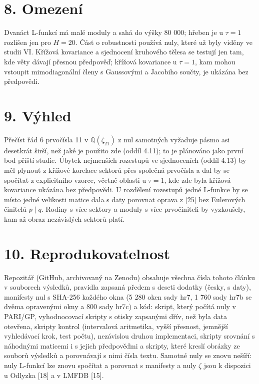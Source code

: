 \documentclass[
  10pt,
]{article}
\begin{document}
\hypertarget{omezenuxed}{%
\section{8. Omezení}\label{omezenuxed}}

Dvanáct L-funkcí má malé moduly a sahá do výšky 80 000; hřeben je u
\(\tau = 1\) rozlišen jen pro \(H = 20\). Část o robustnosti používá
nuly, které už byly viděny ve studii VI. Křížová kovariance a sjednocení
kruhového tělesa se testují jen tam, kde věty dávají přesnou předpověď;
křížová kovariance u \(\tau = 1\), kam mohou vstoupit mimodiagonální
členy s Gaussovými a Jacobiho součty, je ukázána bez předpovědi.

\hypertarget{vuxfdhled}{%
\section{9. Výhled}\label{vuxfdhled}}

Přečíst řád 6 prvočísla 11 v \(\mathbb{Q}(\zeta_{21})\) z nul samotných
vyžaduje pásmo asi desetkrát širší, než jaké je použito zde (oddíl
4.11); to je plánováno jako první bod příští studie. Úbytek nejmenších
rozestupů ve sjednoceních (oddíl 4.13) by měl plynout z křížové korelace
sektorů přes společná prvočísla a dal by se spočítat z explicitního
vzorce, včetně oblasti u \(\tau = 1\), kde zde byla křížová kovariance
ukázána bez předpovědi. U rozdělení rozestupů jedné L-funkce by se místo
jedné velikosti matice dala s daty porovnat oprava z {[}25{]} bez
Eulerových činitelů \(p \mid q\). Rodiny s více sektory a moduly s více
prvočiniteli by vyzkoušely, kam až obraz nezávislých sektorů platí.

\hypertarget{reprodukovatelnost}{%
\section{10. Reprodukovatelnost}\label{reprodukovatelnost}}

Repozitář (GitHub, archivovaný na Zenodu) obsahuje všechna čísla tohoto
článku v souborech výsledků, pravidla zapsaná předem s deseti dodatky
(česky, s daty), manifesty nul s SHA-256 každého okna (5 280 oken sady
hr7, 1 760 sady hr7b se dvěma opravenými okny a 800 sady hr7c) a kód:
skript, který počítá nuly v PARI/GP, vyhodnocovací skripty s otisky
zapsanými dřív, než byla data otevřena, skripty kontrol (intervalová
aritmetika, vyšší přesnost, jemnější vyhledávací krok, test počtu),
nezávislou druhou implementaci, skripty srovnání s náhodnými maticemi i
s jejich předpověďmi a skripty, které kreslí obrázky ze souborů výsledků
a porovnávají s nimi čísla textu. Samotné nuly se znovu nešíří: nuly
L-funkcí lze znovu spočítat a porovnat s manifesty a nuly \(\zeta\) jsou
k dispozici u Odlyzka {[}18{]} a v LMFDB {[}15{]}.
\end{document}
